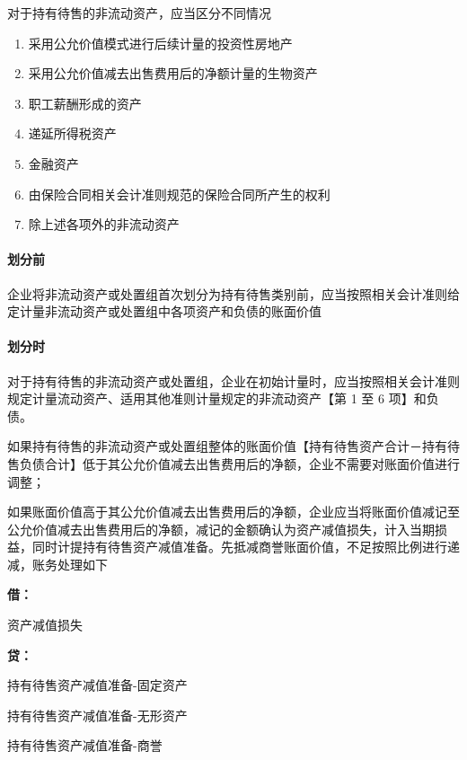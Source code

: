 \documentclass[UTF8,12pt]{ctexart}
\newenvironment{Dr}{%
	\begin{list}{}%
		{
			\setlength{\leftmargin}{2em}
			\setlength{\labelwidth}{2em}
			\setlength{\labelsep}{0pt}
			\setlength{\itemindent}{0pt}
			\setlength{\listparindent}{0pt}
			\setlength{\parsep}{0pt}
			\setlength{\topsep}{0pt}
		}
		\item[\textbf{借：}]
	}{%
	\end{list}
}
\newenvironment{Cr}{%
	\begin{list}{}%
		{
			\setlength{\leftmargin}{2em}
			\setlength{\labelwidth}{2em}
			\setlength{\labelsep}{0pt}
			\setlength{\itemindent}{0pt}
			\setlength{\listparindent}{0pt}
			\setlength{\parsep}{0pt}
			\setlength{\topsep}{0pt}
		}
		\item[\textbf{贷：}]
	}{%
	\end{list}
}
\numberwithin{equation}{section} %
\numberwithin{figure}{section}
\numberwithin{table}{section}
\begin{document}
	对于持有待售的非流动资产，应当区分不同情况
	\begin{enumerate}
		\item 采用公允价值模式进行后续计量的投资性房地产
		
		\item 采用公允价值减去出售费用后的净额计量的生物资产
		
		\item 职工薪酬形成的资产
		
		\item 递延所得税资产
		
		\item 金融资产
		
		\item 由保险合同相关会计准则规范的保险合同所产生的权利
		
		\item 除上述各项外的非流动资产
	\end{enumerate}
	
	\paragraph{划分前}
	企业将非流动资产或处置组首次划分为持有待售类别前，应当按照相关会计准则给定计量非流动资产或处置组中各项资产和负债的账面价值
	
	\paragraph{划分时}
	对于持有待售的非流动资产或处置组，企业在初始计量时，应当按照相关会计准则规定计量流动资产、适用其他准则计量规定的非流动资产【第 1 至 6 项】和负债。
	
	如果持有待售的非流动资产或处置组整体的账面价值【持有待售资产合计－持有待售负债合计】低于其公允价值减去出售费用后的净额，企业不需要对账面价值进行调整；
	
	如果账面价值高于其公允价值减去出售费用后的净额，企业应当将账面价值减记至公允价值减去出售费用后的净额，减记的金额确认为资产减值损失，计入当期损益，同时计提持有待售资产减值准备。先抵减商誉账面价值，不足按照比例进行递减，账务处理如下
	\begin{Dr}
		资产减值损失
	\end{Dr}
	\begin{Cr}
		持有待售资产减值准备-固定资产
		
		持有待售资产减值准备-无形资产
		
		持有待售资产减值准备-商誉
		
	\end{Cr}
	
\end{document}
